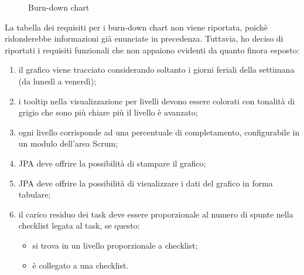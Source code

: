 \begin{figure}[H]
  \vspace*{\fill}
  \caption{Burn-down chart}
  \label{fig:bdchart}
\end{figure}

La tabella dei requisiti per i burn-down chart non viene riportata, poichè
ridonderebbe informazioni già enunciate in precedenza. Tuttavia, ho deciso di
riportati i requisiti funzionali che non appaiono evidenti da quanto finora
esposto:

\begin{enumerate}
\item il grafico viene tracciato considerando soltanto i giorni feriali della
  settimana (da lunedì a venerdì);
\item i tooltip nella visualizzazione per livelli devono essere colorati con
  tonalità di grigio che sono più chiare più il livello è avanzato;
\item ogni livello corrisponde ad una percentuale di completamento,
  configurabile in un modulo dell'area Scrum;
\item JPA deve offrire la possibilità di stampare il grafico;
\item JPA deve offrire la possibilità di visualizzare i dati del grafico in
  forma tabulare;
\item il carico residuo dei task deve essere proporzionale al numero di spunte
  nella checklist legata al task, se questo:
  \begin{itemize}
  \item si trova in un livello proporzionale a checklist;
  \item è collegato a una checklist.
  \end{itemize}
\end{enumerate}

